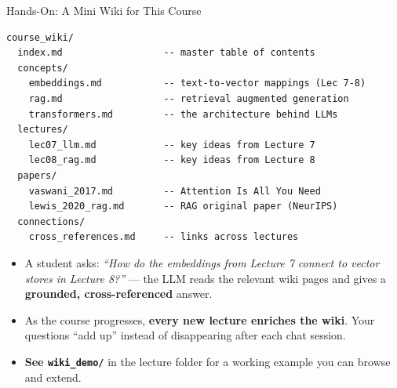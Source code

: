 \documentclass[10pt,english,aspectratio=169]{beamer}
\begin{document}
\begin{frame}[fragile]{Hands-On: A Mini Wiki for This Course}
\begin{lstlisting}[basicstyle=\ttfamily\footnotesize]
course_wiki/
  index.md                  -- master table of contents
  concepts/
    embeddings.md           -- text-to-vector mappings (Lec 7-8)
    rag.md                  -- retrieval augmented generation
    transformers.md         -- the architecture behind LLMs
  lectures/
    lec07_llm.md            -- key ideas from Lecture 7
    lec08_rag.md            -- key ideas from Lecture 8
  papers/
    vaswani_2017.md         -- Attention Is All You Need
    lewis_2020_rag.md       -- RAG original paper (NeurIPS)
  connections/
    cross_references.md     -- links across lectures
\end{lstlisting}

\medskip
\begin{itemize}
\item A student asks: \emph{``How do the embeddings from Lecture 7 connect to vector stores in Lecture 8?''} --- the LLM reads the relevant wiki pages and gives a \textbf{grounded, cross-referenced} answer.
\item As the course progresses, \textbf{every new lecture enriches the wiki}. Your questions ``add up'' instead of disappearing after each chat session.
\item \textbf{See \texttt{wiki\_demo/}} in the lecture folder for a working example you can browse and extend.
\end{itemize}
\end{frame}
\end{document}
